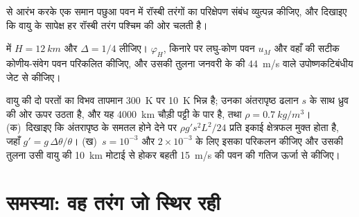 \begin{exercise}[$\star\star\star$]\label{exo:b3:atmospheric-dynamics:10}
 से आरंभ करके एक समान पछुआ पवन में रॉस्बी तरंगों का
परिक्षेपण संबंध व्युत्पन्न कीजिए, और दिखाइए कि वायु के सापेक्ष हर रॉस्बी तरंग
पश्चिम की ओर चलती है।
\end{exercise}

\begin{exercise}[$\star\star\star$]\label{exo:b3:atmospheric-dynamics:11}
 में $H = \qty{12}{km}$ और $\Delta = 1/4$ लीजिए।
$\varphi_H$, किनारे पर लघु-कोण पवन $u_M$ और वहाँ की सटीक कोणीय-संवेग पवन
परिकलित कीजिए, और उसकी तुलना जनवरी के  की
\qty{44}{m/s} वाले उपोष्णकटिबंधीय जेट से कीजिए।
\end{exercise}

\begin{exercise}[$\star\star\star$]\label{exo:b3:atmospheric-dynamics:12}
वायु की दो परतों का विभव तापमान \qty{300}{K} पर \qty{10}{K} भिन्न है;
उनका अंतरापृष्ठ ढलान $s$ के साथ ध्रुव की ओर ऊपर उठता है, और यह \qty{4000}{km}
चौड़ी पट्टी के पार है, तथा $\rho = \qty{0.7}{kg/m^3}$। (क)~दिखाइए कि अंतरापृष्ठ के
समतल होने देने पर $\rho g' s^2L^2/24$ प्रति इकाई
क्षेत्रफल मुक्त होता है, जहाँ $g' = g\,\Delta\theta/\theta$। (ख)~$s = 10^{-3}$ और $2\times10^{-3}$ के लिए
इसका परिकलन कीजिए और उसकी तुलना उसी वायु की \qty{10}{km} मोटाई से होकर
बहती \qty{15}{m/s} की पवन की गतिज ऊर्जा से कीजिए।
\end{exercise}

\section{समस्या: वह तरंग जो स्थिर रही}

